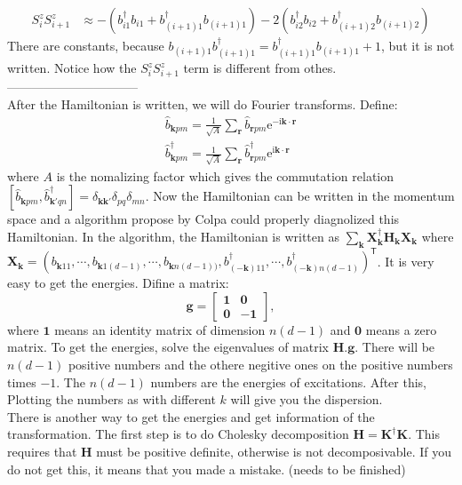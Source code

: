 \documentclass[letter]{article}
\newcommand{\e}{\mathrm{e}}
\newcommand{\ii}{\mathrm{i}}
\begin{document}
$$
\begin{aligned}
    S_{i}^z S_{i+1}^z &\approx-\left(b_{i1}^{\dagger}b_{i1}+b_{(i+1)1}^{\dagger}b_{(i+1)1}\right)-2\left(b_{i2}^{\dagger}b_{i2}+b_{(i+1)2}^{\dagger}b_{(i+1)2}\right)
\end{aligned}
$$
There are constants, because $b_{(i+1)1}b_{(i+1)1}^{\dagger}=b_{(i+1)1}^{\dagger}b_{(i+1)1}+1$, but it is not written. Notice how the $S_{i}^z S_{i+1}^z$  term is different from othes.\\
--------------------------------\\
After the Hamiltonian is written, we will do Fourier transforms. Define:
$$ \begin{aligned}
    \hat{b}_{\bm{k}pm}=\frac{1}{\sqrt{A}}\sum_{\bm{r}}\hat{b}_{\bm{r}pm}\e^{-\ii\bm{k}\cdot\bm{r}} \\
    \hat{b}_{\bm{k}pm}^{\dagger}=\frac{1}{\sqrt{A}}\sum_{\bm{r}}\hat{b}_{\bm{r}pm}^{\dagger}\e^{\ii\bm{k}\cdot\bm{r}}
    \end{aligned} $$
where $A$ is the nomalizing factor which gives the commutation relation $\left[\hat{b}_{\bm{k}pm},\hat{b}_{\bm{k'}qn}^{\dagger}\right]=\delta_{\bm{k}\bm{k}'}\delta_{pq}\delta_{mn}$. Now the Hamiltonian can be written in the momentum space and a algorithm propose by Colpa could properly diagnolized this Hamiltonian. In the algorithm, the Hamiltonian is written as $\sum_{\bm{k}}\mathbf{X}^{\dagger}_{\bm{k}}\mathbf{H}_{\bm{k}}\mathbf{X}_{\bm{k}}$ where $\mathbf{X}_{\bm{k}}=\left(b_{\bm{k}11},\cdots,b_{\bm{k}1(d-1)},\cdots,b_{\bm{k}n(d-1))},b_{(-\bm{k})11}^{\dagger},\cdots,b_{(-\bm{k})n(d-1)}^{\dagger}\right)^{\mathsf{T}}$. It is very easy to get the energies. Difine a matrix:$$
\mathbf{g}=\begin{bmatrix}
    \mathbf{1} & \mathbf{0}  \\
    \mathbf{0} &  -\mathbf{1}
    \end{bmatrix},
$$
where $\mathbf{1}$ means an identity matrix of dimension $n(d-1)$ and $\mathbf{0}$ means a zero matrix. To get the energies, solve the eigenvalues of matrix $\mathbf{H}.\mathbf{g}$. There will be $n(d-1)$ positive numbers and the othere negitive ones on the positive numbers times $-1$. The $n(d-1)$ numbers are the energies of excitations. After this, Plotting the numbers as with different $k$ will give you the dispersion. \\
There is another way to get the energies and get information of the transformation. The first step is to do Cholesky decomposition $\mathbf{H}=\mathbf{K}^{\dagger}\mathbf{K}$. This requires that $\mathbf{H}$ must be positive definite, otherwise is not decomposivable. If you do not get this, it means that you made a mistake. (needs to be finished) \\
\end{document}
